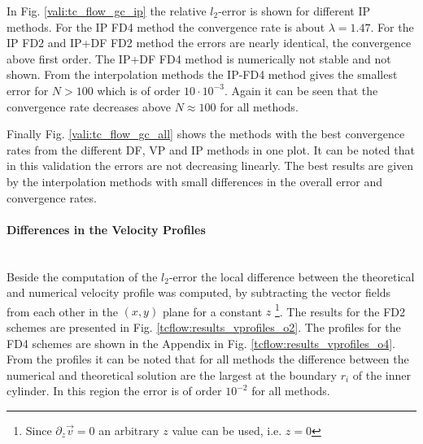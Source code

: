 In Fig. \ref{vali:tc_flow_gc_ip} the relative $l_2$-error is shown for different IP methods.
For the IP FD4 method the convergence rate is about $\lambda=1.47$.
For the IP FD2 and IP+DF FD2 method the errors are nearly  identical, the convergence above first order.
The IP+DF FD4 method is numerically not stable and  not shown.
From the interpolation methods the IP-FD4 method gives the smallest error for $N>100$ which is of order $10 \cdot 10^{-3}$.
Again it can be seen that the convergence rate decreases above $N\approx100$ for all methods.


Finally Fig. \ref{vali:tc_flow_gc_all} shows the methods with the best convergence
rates from the different DF, VP and IP methods in one plot.
It can be noted that in this validation the errors are not decreasing linearly.
The best results are given by the interpolation methods with small differences in the overall error
and convergence rates.

\paragraph{Differences in the Velocity Profiles}\mbox{}\\

Beside the computation of the $l_2$-error the local difference between the theoretical and numerical velocity
profile was computed, by subtracting the vector fields from each other in the $(x, y)$ plane for a constant $z$
\footnote{Since $\partial_z \vec{v} = 0$ an arbitrary $z$ value can be used, i.e. $z=0$}.
The results for the FD2 schemes are presented in Fig. \ref{tcflow:results_vprofiles_o2}. The profiles
for the FD4 schemes are shown in the Appendix in Fig. \ref{tcflow:results_vprofiles_o4}.
From the profiles it can be noted that for all methods the difference between the numerical and
theoretical solution are the largest at the boundary $r_i$ of the  inner cylinder.
In this region the error is of order $10^{-2}$ for all methods.

